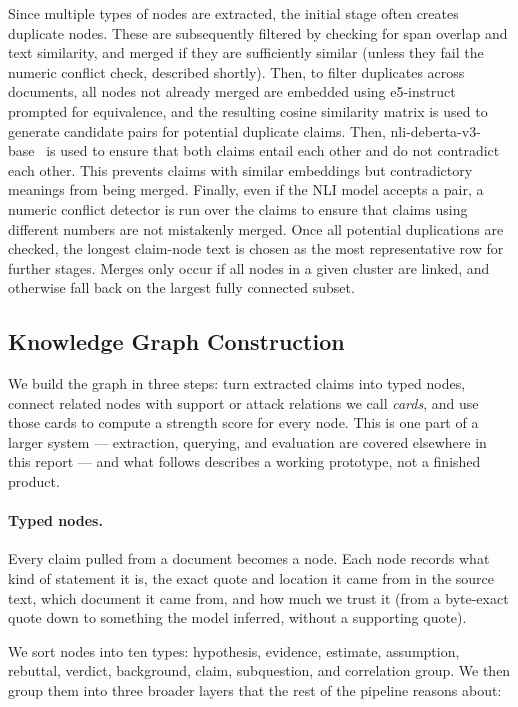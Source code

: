 \documentclass{article}
\begin{document}
Since multiple types of nodes are extracted, the initial stage often creates duplicate nodes. These are subsequently filtered by checking for span overlap and text similarity, and merged if they are sufficiently similar (unless they fail the numeric conflict check, described shortly). Then, to filter duplicates across documents, all nodes not already merged are embedded using e5-instruct~\cite{wang2024multie5} prompted for equivalence, and the resulting cosine similarity matrix is used to generate candidate pairs for potential duplicate claims. Then, nli-deberta-v3-base~\cite{he2023debertav3} is used to ensure that both claims entail each other and do not contradict each other. This prevents claims with similar embeddings but contradictory meanings from being merged. Finally, even if the NLI model accepts a pair, a numeric conflict detector is run over the claims to ensure that claims using different numbers are not mistakenly merged. Once all potential duplications are checked, the longest claim-node text is chosen as the most representative row for further stages. Merges only occur if all nodes in a given cluster are linked, and otherwise fall back on the largest fully connected subset.

\subsection{Knowledge Graph Construction}

We build the graph in three steps: turn extracted claims into typed nodes,
connect related nodes with support or attack relations we call \emph{cards}, and
use those cards to compute a strength score for every node. This is one part of a
larger system --- extraction, querying, and evaluation are covered elsewhere in
this report --- and what follows describes a working prototype, not a finished
product.

\paragraph{Typed nodes.}
Every claim pulled from a document becomes a node. Each node records what kind of
statement it is, the exact quote and location it came from in the source text,
which document it came from, and how much we trust it (from a byte-exact quote
down to something the model inferred, without a supporting quote).

We sort nodes into ten types: hypothesis, evidence, estimate, assumption,
rebuttal, verdict, background, claim, subquestion, and correlation group. We then group them into three broader layers that the rest of the pipeline reasons about:
\end{document}
